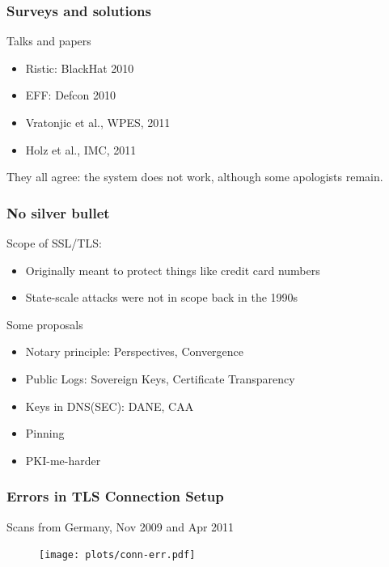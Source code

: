 \begin{frame}
  \frametitle{Surveys and solutions}
  \begin{block}{Talks and papers}
    \begin{itemize}
      \item Ristic: BlackHat 2010
      \item EFF: Defcon 2010
      \item Vratonjic et al., WPES, 2011
      \item Holz et al., IMC, 2011
    \end{itemize}
  \end{block}
  \begin{block}{They all agree: the system does not work, although some apologists remain.}\end{block}
\end{frame}


\begin{frame}
\frametitle{No silver bullet}
  \begin{block}{Scope of SSL/TLS:}
    \begin{itemize}
      \item Originally meant to protect things like credit card numbers
      \item State-scale attacks were not in scope back in the 1990s
    \end{itemize}
  \end{block}
  \begin{block}{Some proposals}
    \begin{itemize}
      \item Notary principle: Perspectives, Convergence
      \item Public Logs: Sovereign Keys, Certificate Transparency
      \item Keys in DNS(SEC): DANE, CAA
      \item Pinning
      \item PKI-me-harder
    \end{itemize}
  \end{block}
\end{frame}

\begin{frame}
  \frametitle{Errors in TLS Connection Setup}
  \begin{block}{Scans from Germany, Nov 2009 and Apr 2011}
    \begin{figure}
    \centering
      \texttt{[image: plots/conn-err.pdf]}
    \end{figure}
  \end{block}
\end{frame}


